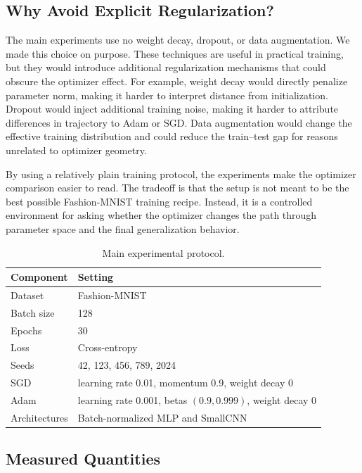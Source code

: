 \documentclass[11pt]{article}
\begin{document}
\subsection{Why Avoid Explicit Regularization?}

The main experiments use no weight decay, dropout, or data augmentation. We made this choice on purpose. These techniques are useful in practical training, but they would introduce additional regularization mechanisms that could obscure the optimizer effect. For example, weight decay would directly penalize parameter norm, making it harder to interpret distance from initialization. Dropout would inject additional training noise, making it harder to attribute differences in trajectory to Adam or SGD. Data augmentation would change the effective training distribution and could reduce the train--test gap for reasons unrelated to optimizer geometry.

By using a relatively plain training protocol, the experiments make the optimizer comparison easier to read. The tradeoff is that the setup is not meant to be the best possible Fashion-MNIST training recipe. Instead, it is a controlled environment for asking whether the optimizer changes the path through parameter space and the final generalization behavior.

\begin{table}[H]
\centering
\begin{tabular}{ll}
\toprule
\textbf{Component} & \textbf{Setting}\\
\midrule
Dataset & Fashion-MNIST\\
Batch size & 128\\
Epochs & 30\\
Loss & Cross-entropy\\
Seeds & 42, 123, 456, 789, 2024\\
SGD & learning rate 0.01, momentum 0.9, weight decay 0\\
Adam & learning rate 0.001, betas $(0.9,0.999)$, weight decay 0\\
Architectures & Batch-normalized MLP and SmallCNN\\
\bottomrule
\end{tabular}
\caption{Main experimental protocol.}
\label{tab:setup}
\end{table}

\subsection{Measured Quantities}
\end{document}
